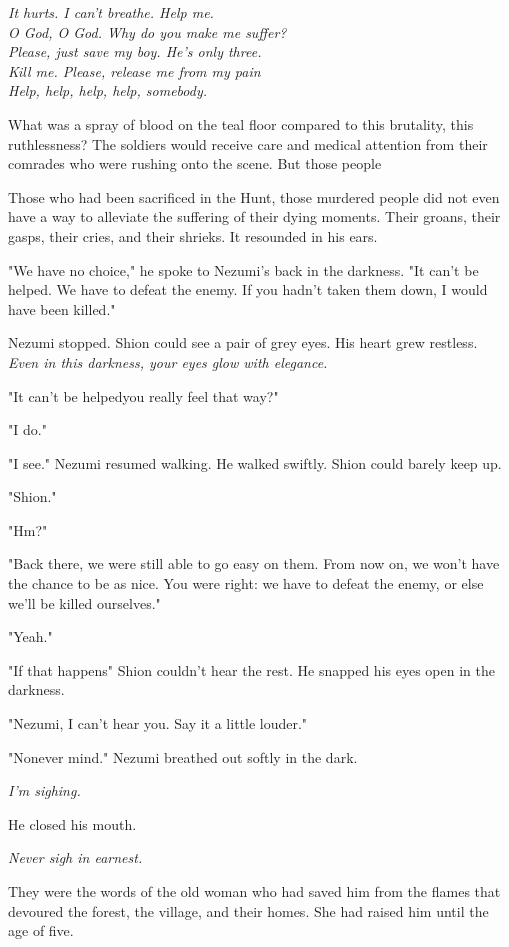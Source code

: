 \myspace

\emph{It hurts. I can't breathe. Help me.\\
	O God, O God. Why do you make me suffer?\\
	Please, just save my boy. He's only three.\\
	Kill me. Please, release me from my pain\el \\
	Help, help, help, help, somebody.}

\myspace

What was a spray of blood on the teal floor compared to this brutality,
this ruthlessness? The soldiers would receive care and medical attention
from their comrades who were rushing onto the scene. But those people\el 

Those who had been sacrificed in the Hunt, those murdered people did not
even have a way to alleviate the suffering of their dying moments. Their
groans, their gasps, their cries, and their shrieks. It resounded in his
ears.

"We have no choice," he spoke to Nezumi's back in the darkness. "It
can't be helped. We have to defeat the enemy. If you hadn't taken them
down, I would have been killed."

Nezumi stopped. Shion could see a pair of grey eyes. His heart grew
restless. \emph{Even in this darkness, your eyes glow with elegance.}

"It can't be helped\el you really feel that way?"

"I do."

"\el I see." Nezumi resumed walking. He walked swiftly. Shion could
barely keep up.

"Shion."

"Hm?"

"Back there, we were still able to go easy on them. From now on, we
won't have the chance to be as nice. You were right: we have to defeat
the enemy, or else we'll be killed ourselves."

"Yeah."

"If that happens\el " Shion couldn't hear the rest. He snapped his eyes
open in the darkness.

"Nezumi, I can't hear you. Say it a little louder."

"No\el never mind." Nezumi breathed out softly in the dark.

\emph{I'm sighing.}

He closed his mouth.

\emph{Never sigh in earnest.}

They were the words of the old woman who had saved him from the flames
that devoured the forest, the village, and their homes. She had raised
him until the age of five.

